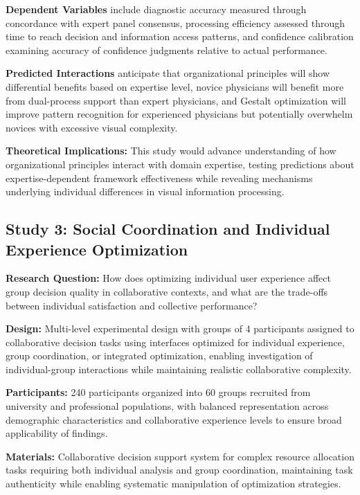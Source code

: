 \documentclass[
  authoryear,
  preprint]{elsarticle}
\begin{document}
\textbf{Dependent Variables} include diagnostic accuracy measured
through concordance with expert panel consensus, processing efficiency
assessed through time to reach decision and information access patterns,
and confidence calibration examining accuracy of confidence judgments
relative to actual performance.

\textbf{Predicted Interactions} anticipate that organizational
principles will show differential benefits based on expertise level,
novice physicians will benefit more from dual-process support than
expert physicians, and Gestalt optimization will improve pattern
recognition for experienced physicians but potentially overwhelm novices
with excessive visual complexity.

\textbf{Theoretical Implications:} This study would advance
understanding of how organizational principles interact with domain
expertise, testing predictions about expertise-dependent framework
effectiveness while revealing mechanisms underlying individual
differences in visual information processing.

\subsection{Study 3: Social Coordination and Individual Experience
Optimization}\label{study-3-social-coordination-and-individual-experience-optimization}

\textbf{Research Question:} How does optimizing individual user
experience affect group decision quality in collaborative contexts, and
what are the trade-offs between individual satisfaction and collective
performance?

\textbf{Design:} Multi-level experimental design with groups of 4
participants assigned to collaborative decision tasks using interfaces
optimized for individual experience, group coordination, or integrated
optimization, enabling investigation of individual-group interactions
while maintaining realistic collaborative complexity.

\textbf{Participants:} 240 participants organized into 60 groups
recruited from university and professional populations, with balanced
representation across demographic characteristics and collaborative
experience levels to ensure broad applicability of findings.

\textbf{Materials:} Collaborative decision support system for complex
resource allocation tasks requiring both individual analysis and group
coordination, maintaining task authenticity while enabling systematic
manipulation of optimization strategies.
\end{document}
